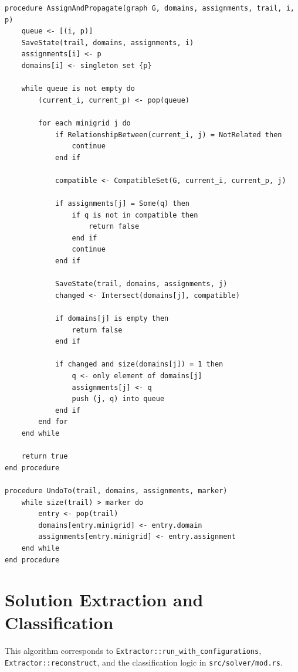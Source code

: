 \documentclass[11pt,a4paper]{article}
\begin{document}
\begin{lstlisting}[caption={Assignment, propagation, and trail-based undo}]
procedure AssignAndPropagate(graph G, domains, assignments, trail, i, p)
    queue <- [(i, p)]
    SaveState(trail, domains, assignments, i)
    assignments[i] <- p
    domains[i] <- singleton set {p}

    while queue is not empty do
        (current_i, current_p) <- pop(queue)

        for each minigrid j do
            if RelationshipBetween(current_i, j) = NotRelated then
                continue
            end if

            compatible <- CompatibleSet(G, current_i, current_p, j)

            if assignments[j] = Some(q) then
                if q is not in compatible then
                    return false
                end if
                continue
            end if

            SaveState(trail, domains, assignments, j)
            changed <- Intersect(domains[j], compatible)

            if domains[j] is empty then
                return false
            end if

            if changed and size(domains[j]) = 1 then
                q <- only element of domains[j]
                assignments[j] <- q
                push (j, q) into queue
            end if
        end for
    end while

    return true
end procedure

procedure UndoTo(trail, domains, assignments, marker)
    while size(trail) > marker do
        entry <- pop(trail)
        domains[entry.minigrid] <- entry.domain
        assignments[entry.minigrid] <- entry.assignment
    end while
end procedure
\end{lstlisting}

\section{Solution Extraction and Classification}

This algorithm corresponds to \texttt{Extractor::run\_with\_configurations}, \texttt{Extractor::reconstruct}, and the classification logic in \texttt{src/solver/mod.rs}.
\end{document}
